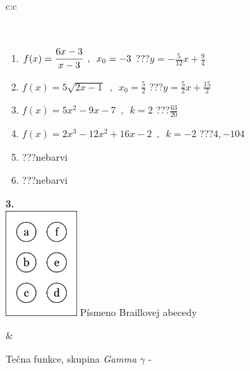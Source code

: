 \documentclass[10pt]{report}
\begin{document}
\begin{tabular}{c:c}
\begin{minipage}[c][104.5mm][t]{0.5\linewidth}
\begin{center}
\begin{minipage}{0.95\linewidth}
\begin{center}
\end{center}
\end{minipage}
\\[1mm]
\begin{minipage}{0.79\linewidth}
\begin{center}
\begin{varwidth}{\linewidth}
\begin{enumerate}
\small
\item $f(x)=\cfrac{6x-3}{x-3}\enspace , \enspace x_0=-3$\quad \dotfill\; ???\;\dotfill \quad $y = -\frac{5}{12}x+\frac{9}{4}$
\item $f(x)=5\sqrt{2x-1}\enspace , \enspace x_0=\frac{5}{2}$\quad \dotfill\; ???\;\dotfill \quad $y = \frac{5}{2}x+\frac{15}{2}$
\item $f(x)=5x^2-9x-7\enspace , \enspace k=2$\quad \dotfill\; ???\;\dotfill \quad $\frac{63}{20}$
\item $f(x)=2x^3-12x^2+16x-2\enspace , \enspace k=-2$\quad \dotfill\; ???\;\dotfill \quad $4 , -104$
\item \quad \dotfill\; ???\;\dotfill \quad nebarvi
\item \quad \dotfill\; ???\;\dotfill \quad nebarvi
\end{enumerate}
\end{varwidth}
\end{center}
\end{minipage}
\begin{minipage}{0.20\linewidth}
\begin{center}
{\Huge\bfseries 3.} \\[2mm]
\includegraphics[height=40mm]{../images/braille.png}
{\small Písmeno Braillovej abecedy}
\end{center}
\end{minipage}
\end{center}
\end{minipage}
&
\begin{minipage}[c][104.5mm][t]{0.5\linewidth}
\begin{center}
\vspace{7mm}
{\huge Tečna funkce, skupina \textit{Gamma $\gamma$} -}\\[5mm]

\end{center}
\end{minipage}
\end{tabular}
\end{document}
